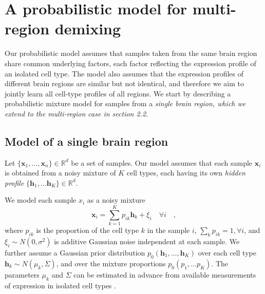 \documentclass{article} %
\newcommand{\reals}{\mathbb{R}}
\begin{document}
\section{A probabilistic model for multi-region demixing}
\vspace{-10pt}
\newcommand{\x}{\mathbf{x}}
\renewcommand{\c}{\mathbf{h}}
\renewcommand{\H}{{H}}
\newcommand{\Htext}{{H}}
\newcommand{\paren}[1]{\left({#1}\right)}
\newcommand{\brackets}[1]{\left[{#1}\right]}
\newcommand{\norm}[1]{\|{#1}\|}
\newcommand{\argmin}{\operatornamewithlimits{argmin}}
Our probabilistic model assumes that samples taken from the same brain region share common underlying factors, each factor reflecting the expression profile of an isolated cell type. The model also assumes that the expression profiles of different brain regions are similar but not identical, and therefore we aim to jointly learn all cell-type profiles of all regions. We start by describing a  probabilistic mixture model for samples from a \em{single} brain region, which we extend to the \em{multi-region} case in section 2.2.

\subsection{Model of a single brain region}
Let $\{\x_1, \ldots, \x_n\} \in \reals^d$ be a set of samples. Our model assumes that each sample $\x_i$ is obtained from a noisy mixture of $K$ cell types, each having its own {\em {hidden profile}} $\{\c_1, \ldots \c_K \}\in \reals^d$.

We model each sample $x_i$ as a noisy mixture
\begin{equation*}
 \x_i = \sum_{k=1}^K p_{ik} \c_k + \xi_i \quad\forall i \quad,
\end{equation*}
where $p_{ik}$ is the proportion of the cell type $k$ in the sample $i$, $\sum_k p_{ik} = 1, \forall i$, and $\xi_i \sim N(0,\sigma^2)$ is additive Gaussian noise independent at each sample. We further assume a Gaussian prior distribution $p_0( \c_1, \ldots, \c_K)$ over each cell type $ \c_k  \sim N(\mu_k, \Sigma) $, and over the mixture proportions $p_0(p_1, \ldots p_K)$. The parameters $\mu_k$ and $\Sigma$ can be estimated in advance from available measurements of expression in isolated cell types \cite{okaty2011cell,darmanis2015survey}.
\end{document}
